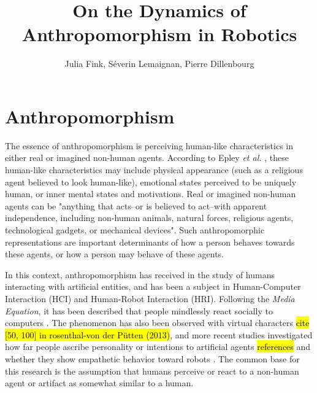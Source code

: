 \documentclass[lettersize, apacite, twoside, HRI]{apa_HRI}
\title{On the Dynamics of Anthropomorphism in Robotics
}
\author{Julia Fink, Séverin Lemaignan, Pierre Dillenbourg}
\affiliation{ Computer-Human Interaction in Learning and Instruction (CHILI) \\
              Ecole Polytechnique Fédérale de Lausanne (EPFL) \\
              CH-1015 Lausanne, Switzerland
}
\begin{document}
\maketitle


%
%
%
%
%
%


\section{Anthropomorphism}
\label{sec:intro}


The essence of anthropomorphism is perceiving human-like characteristics in either real or imagined non-human agents. According to Epley \textit{et al.} \cite{epley_when_2008}, these human-like characteristics may include physical appearance (such as a religious agent believed to look human-like), emotional states perceived to be uniquely human, or inner mental states and motivations. Real or imagined non-human agents can be "anything that acts--or is believed to act--with apparent independence, including non-human animals, natural forces, religious agents, technological gadgets, or mechanical devices". Such anthropomorphic representations are important determinants of how a person behaves towards these agents, or how a person may behave  of these agents.

	
In this context, anthropomorphism has received  in the study of humans interacting with artificial entities, and has been a subject in Human-Computer Interaction (HCI) and Human-Robot Interaction (HRI). Following the \textit{Media Equation}, it has been described that people mindlessly react socially to computers \cite{reeves_media_1996}. The phenomenon has also been observed with virtual characters \hl{cite [50, 100] in rosenthal-von der P{\"u}tten (2013)}, and more recent studies investigated how far people ascribe personality or intentions to artificial agents \hl{references} and whether they show empathetic behavior toward robots \cite{rosenthal-vonderputten_experimental_2013}. The common base for this research is the assumption that humans perceive or react to a non-human agent or artifact as somewhat similar to a human.
\end{document}
